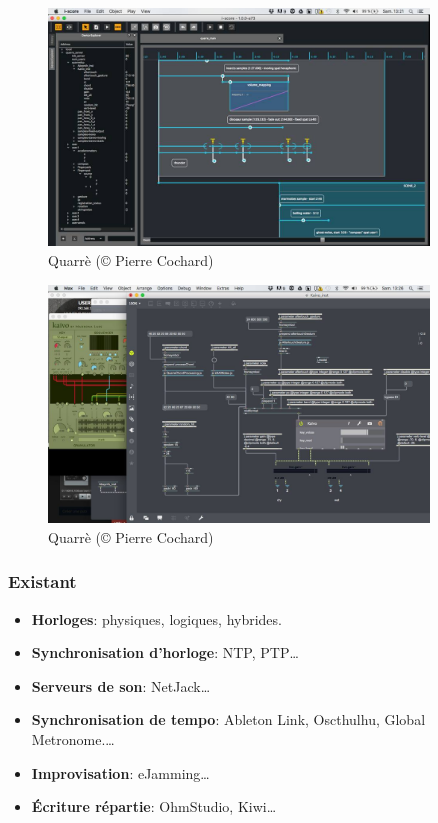 \documentclass[handout]{beamer}
\begin{document}
\begin{frame}
\Large
\begin{figure}
	\centering
	\includegraphics[width=0.9\textwidth]{images/quarre-2.jpg}
	\caption{Quarrè (© Pierre Cochard)}
\end{figure}
\end{frame}

\begin{frame}
\Large
\begin{figure}
	\centering
	\includegraphics[width=0.9\textwidth]{images/quarre-3.jpg}
	\caption{Quarrè (© Pierre Cochard)}
\end{figure}
\end{frame}


\begin{frame}
    \frametitle{Existant}
    \Large
    \begin{itemize}
        \item \textbf{Horloges}: physiques, logiques, hybrides\cite{lamport1978time,kulkarni2014logical}.
        \item \textbf{Synchronisation d'horloge}: NTP, PTP\cite{mills1991internet,peng2009research}\dots
        \item \textbf{Serveurs de son}: NetJack\cite{carot2009netjack}\dots
        \item \textbf{Synchronisation de tempo}: Ableton Link, Oscthulhu, Global Metronome.\cite{oda2016global}\dots
        \item \textbf{Improvisation}: eJamming\cite{carot2007networked}\dots
        \item \textbf{Écriture répartie}: OhmStudio, Kiwi\dots
    \end{itemize}
\end{frame}
\end{document}
